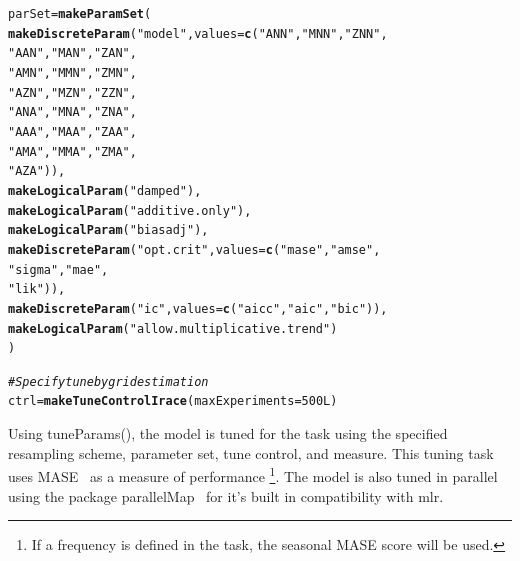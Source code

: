 \documentclass[12pt]{article}\usepackage[]{graphicx}\usepackage[]{color}
\makeatletter
\newcommand{\hlnum}[1]{\textcolor[rgb]{0.686,0.059,0.569}{#1}}%
\newcommand{\hlstr}[1]{\textcolor[rgb]{0.192,0.494,0.8}{#1}}%
\newcommand{\hlcom}[1]{\textcolor[rgb]{0.678,0.584,0.686}{\textit{#1}}}%
\newcommand{\hlstd}[1]{\textcolor[rgb]{0.345,0.345,0.345}{#1}}%
\newcommand{\hlkwb}[1]{\textcolor[rgb]{0.69,0.353,0.396}{#1}}%
\newcommand{\hlkwc}[1]{\textcolor[rgb]{0.333,0.667,0.333}{#1}}%
\newcommand{\hlkwd}[1]{\textcolor[rgb]{0.737,0.353,0.396}{\textbf{#1}}}%
\newenvironment{kframe}{%
 \def\at@end@of@kframe{}%
 \ifinner\ifhmode%
  \def\at@end@of@kframe{\end{minipage}}%
  \begin{minipage}{\columnwidth}%
 \fi\fi%
 \def\FrameCommand##1{\hskip\@totalleftmargin \hskip-\fboxsep
 \colorbox{shadecolor}{##1}\hskip-\fboxsep
     \hskip-\linewidth \hskip-\@totalleftmargin \hskip\columnwidth}%
 \MakeFramed {\advance\hsize-\width
   \@totalleftmargin\z@ \linewidth\hsize
   \@setminipage}}%
 {\par\unskip\endMakeFramed%
 \at@end@of@kframe}
\newenvironment{knitrout}{}{} %
\theoremstyle{definition}
\newcommand\code{\@codex}
\def\@codex#1{{\normalfont\ttfamily\hyphenchar\font=-1 #1}}
\newcommand{\pkg}[1]{{\fontseries{b}\selectfont #1}}
\makeatother
\begin{document}
\singlespacing                                      
\begin{knitrout}
\color{fgcolor}\begin{kframe}
\begin{alltt}
\hlstd{parSet} \hlkwb{=} \hlkwd{makeParamSet}\hlstd{(}
  \hlkwd{makeDiscreteParam}\hlstd{(}\hlstr{"model"}\hlstd{,} \hlkwc{values} \hlstd{=} \hlkwd{c}\hlstd{(}\hlstr{"ANN"}\hlstd{,} \hlstr{"MNN"}\hlstd{,} \hlstr{"ZNN"}\hlstd{,}
                                        \hlstr{"AAN"}\hlstd{,} \hlstr{"MAN"}\hlstd{,} \hlstr{"ZAN"}\hlstd{,}
                                        \hlstr{"AMN"}\hlstd{,} \hlstr{"MMN"}\hlstd{,} \hlstr{"ZMN"}\hlstd{,}
                                        \hlstr{"AZN"}\hlstd{,} \hlstr{"MZN"}\hlstd{,} \hlstr{"ZZN"}\hlstd{,}
                                        \hlstr{"ANA"}\hlstd{,} \hlstr{"MNA"}\hlstd{,} \hlstr{"ZNA"}\hlstd{,}
                                        \hlstr{"AAA"}\hlstd{,} \hlstr{"MAA"}\hlstd{,} \hlstr{"ZAA"}\hlstd{,}
                                        \hlstr{"AMA"}\hlstd{,} \hlstr{"MMA"}\hlstd{,} \hlstr{"ZMA"}\hlstd{,}
                                        \hlstr{"AZA"}\hlstd{)),}
  \hlkwd{makeLogicalParam}\hlstd{(}\hlstr{"damped"}\hlstd{),}
  \hlkwd{makeLogicalParam}\hlstd{(}\hlstr{"additive.only"}\hlstd{),}
  \hlkwd{makeLogicalParam}\hlstd{(}\hlstr{"biasadj"}\hlstd{),}
  \hlkwd{makeDiscreteParam}\hlstd{(}\hlstr{"opt.crit"}\hlstd{,} \hlkwc{values} \hlstd{=} \hlkwd{c}\hlstd{(}\hlstr{"mase"}\hlstd{,} \hlstr{"amse"}\hlstd{,}
                                           \hlstr{"sigma"}\hlstd{,} \hlstr{"mae"}\hlstd{,}
                                           \hlstr{"lik"}\hlstd{)),}
  \hlkwd{makeDiscreteParam}\hlstd{(}\hlstr{"ic"}\hlstd{,} \hlkwc{values} \hlstd{=} \hlkwd{c}\hlstd{(}\hlstr{"aicc"}\hlstd{,} \hlstr{"aic"}\hlstd{,} \hlstr{"bic"}\hlstd{)),}
  \hlkwd{makeLogicalParam}\hlstd{(}\hlstr{"allow.multiplicative.trend"}\hlstd{)}
\hlstd{)}

\hlcom{#Specify tune by grid estimation}
\hlstd{ctrl} \hlkwb{=} \hlkwd{makeTuneControlIrace}\hlstd{(}\hlkwc{maxExperiments} \hlstd{=} \hlnum{500L}\hlstd{)}
\end{alltt}
\end{kframe}
\end{knitrout}
\doublespacing

Using \code{tuneParams()}, the model is tuned for the task using the specified resampling scheme, parameter set, tune control, and measure. This tuning task uses MASE~\cite{Hyndman2006} as a measure of performance \footnote{If a frequency is defined in the task, the seasonal MASE score will be used.}. The model is also tuned in parallel using the package \pkg{parallelMap}~\cite{parallel} for it's built in compatibility with \pkg{mlr}.
\end{document}
